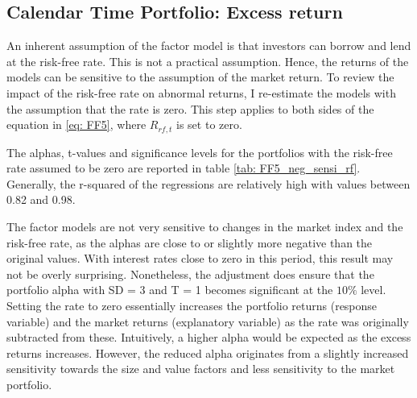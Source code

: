 \subsection{Calendar Time Portfolio: Excess return}

An inherent assumption of the factor model is that investors can borrow and lend at the risk-free rate. This is not a practical assumption. Hence, the returns of the models can be sensitive to the assumption of the market return. 
To review the impact of the risk-free rate on abnormal returns, I re-estimate the models with the assumption that the rate is zero. This step applies to both sides of the equation in \ref{eq: FF5}, where $R_{rf,t}$ is set to zero. 

The alphas, t-values and significance levels for the portfolios with the risk-free rate assumed to be zero are reported in table \ref{tab: FF5_neg_sensi_rf}. Generally, the r-squared of the regressions are relatively high with values between 0.82 and 0.98. 

The factor models are not very sensitive to changes in the market index and the risk-free rate, as the alphas are close to or slightly more negative than the original values.  With interest rates close to zero in this period, this result may not be overly surprising. Nonetheless, the adjustment does ensure that the portfolio alpha with SD = 3 and T = 1 becomes significant at the $10\%$ level. Setting the rate to zero essentially increases the portfolio returns (response variable) and the market returns (explanatory variable) as the rate was originally subtracted from these. Intuitively, a higher alpha would be expected as the excess returns increases. However, the reduced alpha originates from a slightly increased sensitivity towards the size and value factors and less sensitivity to the market portfolio.       


